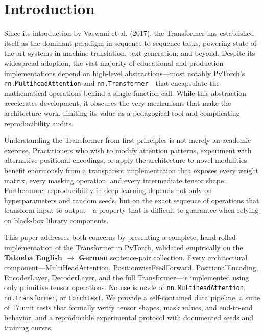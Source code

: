 \documentclass[10pt]{article}
\begin{document}
\begin{abstract}
We further provide a self-contained data pipeline supporting both word-level and subword (SentencePiece BPE) tokenization, a built-from-scratch vocabulary, and length-bucketed batching. Because attention weights are exposed as first-class outputs of the forward pass, the implementation also supports interpretability analysis: we report per-sentence heatmaps of encoder self-attention, decoder self-attention, and decoder cross-attention on the final layer (Section~5.5), where the under-trained control produces diffuse cross-attention maps whereas the final checkpoint exhibits sharp source--target alignment peaks on short test sentences. All code, hyperparameters, and experimental logs are publicly available, designed for transparency, auditability, and pedagogical use.
\end{abstract}

\section{Introduction}

Since its introduction by Vaswani et al. (2017), the Transformer has established itself as the dominant paradigm in sequence-to-sequence tasks, powering state-of-the-art systems in machine translation, text generation, and beyond. Despite its widespread adoption, the vast majority of educational and production implementations depend on high-level abstractions---most notably PyTorch's \texttt{nn.MultiheadAttention} and \texttt{nn.Transformer}---that encapsulate the mathematical operations behind a single function call. While this abstraction accelerates development, it obscures the very mechanisms that make the architecture work, limiting its value as a pedagogical tool and complicating reproducibility audits.

Understanding the Transformer from first principles is not merely an academic exercise. Practitioners who wish to modify attention patterns, experiment with alternative positional encodings, or apply the architecture to novel modalities benefit enormously from a transparent implementation that exposes every weight matrix, every masking operation, and every intermediate tensor shape. Furthermore, reproducibility in deep learning depends not only on hyperparameters and random seeds, but on the exact sequence of operations that transform input to output---a property that is difficult to guarantee when relying on black-box library components.

This paper addresses both concerns by presenting a complete, hand-rolled implementation of the Transformer in PyTorch, validated empirically on the \textbf{Tatoeba English $\rightarrow$ German} sentence-pair collection. Every architectural component---MultiHeadAttention, PositionwiseFeedForward, PositionalEncoding, EncoderLayer, DecoderLayer, and the full Transformer---is implemented using only primitive tensor operations. No use is made of \texttt{nn.MultiheadAttention}, \texttt{nn.Transformer}, or \texttt{torchtext}. We provide a self-contained data pipeline, a suite of 17 unit tests that formally verify tensor shapes, mask values, and end-to-end behavior, and a reproducible experimental protocol with documented seeds and training curves.
\end{document}
